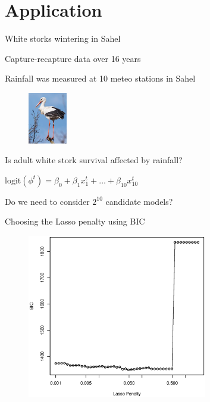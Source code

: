 \documentclass[14pt]{beamer}
\begin{document}
\section{Application}

\begin{frame}[fragile]{White storks wintering in Sahel}

Capture-recapture data over 16 years

Rainfall was measured at 10 meteo stations in Sahel

{
  \begin{figure}
    \centering
    \includegraphics[width = 0.15\textwidth]{Ringed_white_stork.jpg}
  \end{figure}

}

Is adult white stork survival affected by rainfall?

$\text{logit}(\phi^t) = \beta_0 + \beta_1 x_1^t + \ldots + \beta_{10} x_{10}^t$

Do we need to consider $2^{10}$ candidate models?

\end{frame}

\begin{frame}[fragile]{Choosing the Lasso penalty using BIC}

{
  \begin{figure}
    \centering
    \includegraphics[width = 0.7\textwidth]{bic.eps}
  \end{figure}

}

\end{frame}
\end{document}
